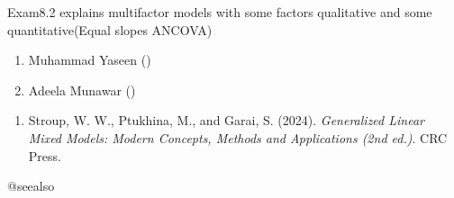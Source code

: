 \documentclass[a4paper]{book}
\begin{document}
%
\begin{Description}
Exam8.2 explains multifactor models with some factors qualitative and some quantitative(Equal slopes ANCOVA)
\end{Description}
%
\begin{Author}
\begin{enumerate}

\item{}  Muhammad Yaseen ()
\item{} Adeela Munawar ()

\end{enumerate}

\end{Author}
%
\begin{References}
\begin{enumerate}

\item{} Stroup, W. W., Ptukhina, M., and Garai, S. (2024).
\emph{Generalized Linear Mixed Models: Modern Concepts, Methods and Applications (2nd ed.)}.
CRC Press.

\end{enumerate}


@seealso
\end{References}
%
\end{document}

